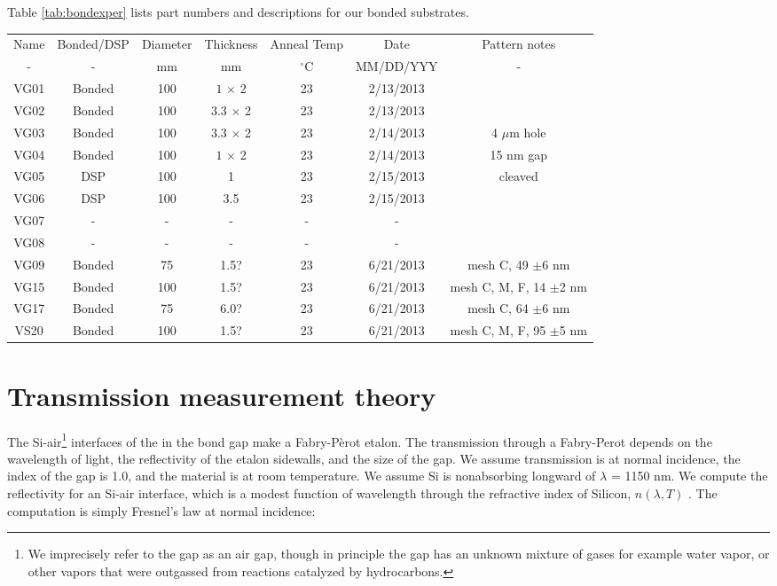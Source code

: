 \documentclass[osajnl,preprint,showpacs,superscriptaddress,12pt]{revtex4-1} %
\begin{document}
Table \ref{tab:bondexper} lists part numbers and descriptions for our bonded substrates.

\begin{table}[h!]
\begin{center}
    \begin{tabular}{ c c c c c c c}
    \hline
    Name & Bonded/DSP & Diameter & Thickness & Anneal Temp & Date & Pattern notes \\ 
    - & - & mm & mm & $^\circ$C & MM/DD/YYY & - \\ 
        \hline
    VG01 & Bonded  & 100  &$1$ $\times$ 2 & 23  & 2/13/2013 &  \\
    VG02 & Bonded & 100 & $3.3$ $\times$ 2 &  23  & 2/13/2013 &  \\
    VG03 & Bonded & 100 & $3.3$ $\times$ 2 &  23 & 2/14/2013 & 4 $\mu$m hole \\    
    VG04 & Bonded & 100 & $1$ $\times$ 2 &  23 & 2/14/2013 & 15 nm gap \\        
    VG05 & DSP & 100 & 1&  23 & 2/15/2013 & cleaved  \\
    VG06 & DSP & 100 & 3.5 &  23 & 2/15/2013 & \\
    VG07 & - & - & - &  - & - & \\
    VG08 & - & - & - &  - & - & \\
    VG09 & Bonded & 75 & 1.5? & 23 & 6/21/2013 & mesh C, 49 $\pm$6 nm \\
    VG15 & Bonded & 100 & 1.5? &  23 & 6/21/2013 & mesh C, M, F, 14 $\pm$2 nm\\
    VG17 & Bonded & 75 & 6.0? &  23 & 6/21/2013 & mesh C, 64 $\pm$6 nm\\
    VS20 & Bonded & 100 & 1.5? &  23 & 6/21/2013 & mesh C, M, F, 95 $\pm$5 nm\\
    \hline
    \end{tabular}
\end{center}
\end{table}

\section{Transmission measurement theory}
The Si-air\footnote{We imprecisely refer to the gap as an air gap, though in principle the gap has an unknown mixture of gases for example water vapor, or other vapors that were outgassed from reactions catalyzed by hydrocarbons.} interfaces of the in the bond gap make a Fabry-P\`erot etalon\cite{2007fuph.book.....S}.  The transmission through a Fabry-Perot depends on the wavelength of light, the reflectivity of the etalon sidewalls, and the size of the gap.  We assume transmission is at normal incidence, the index of the gap is 1.0, and the material is at room temperature.  We assume Si is nonabsorbing longward of $\lambda$ = 1150 nm.  We compute the reflectivity for an Si-air interface, which is a modest function of wavelength through the refractive index of Silicon, $n(\lambda, T)$ \cite{2006SPIE.6273E..77F}.  The computation is simply Fresnel's law at normal incidence:
\end{document}
